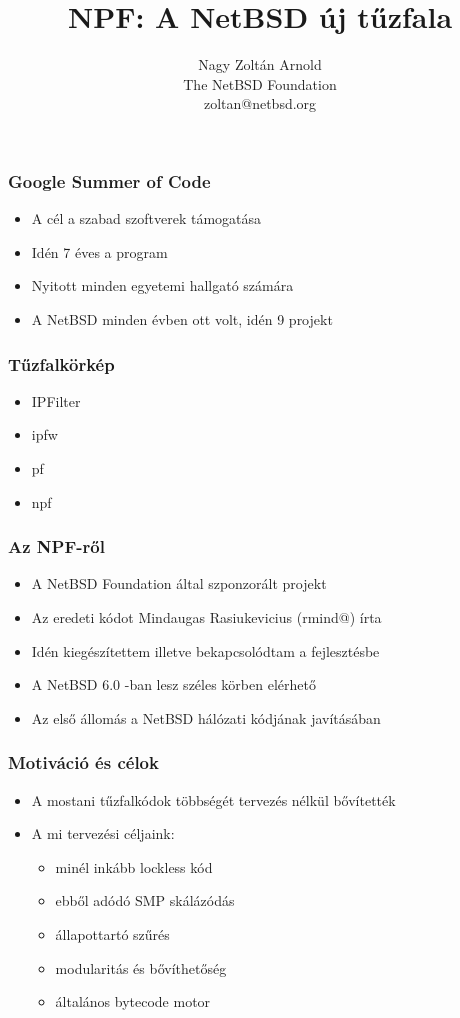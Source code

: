 \documentclass[magyar]{beamer}
\begin{document}
\title{NPF: A NetBSD új tűzfala}
\author{Nagy Zoltán Arnold \\ The NetBSD Foundation \\ zoltan@netbsd.org}
\maketitle

\begin{frame}
\frametitle{Google Summer of Code}
\begin{itemize}
	\item A cél a szabad szoftverek támogatása
	\item Idén 7 éves a program
	\item Nyitott minden egyetemi hallgató számára
	\item A NetBSD minden évben ott volt, idén 9 projekt
\end{itemize}
\end{frame}

\begin{frame}
\frametitle{Tűzfalkörkép}
\begin{itemize}
	\item IPFilter
	\item ipfw
	\item pf
	\item npf
\end{itemize}
\end{frame}

\begin{frame}
\frametitle{Az NPF-ről}
\begin{itemize}
	\item A NetBSD Foundation által szponzorált projekt
	\item Az eredeti kódot Mindaugas Rasiukevicius (rmind@) írta
	\item Idén kiegészítettem illetve bekapcsolódtam a fejlesztésbe
	\item A NetBSD 6.0 -ban lesz széles körben elérhető
	\item Az első állomás a NetBSD hálózati kódjának javításában
\end{itemize}
\end{frame}

\begin{frame}
\frametitle{Motiváció és célok}
\begin{itemize}
	\item A mostani tűzfalkódok többségét tervezés nélkül bővítették
	\item A mi tervezési céljaink:
	\begin{itemize}
		\item minél inkább lockless kód
		\item ebből adódó SMP skálázódás
		\item állapottartó szűrés
		\item modularitás és bővíthetőség
		\item általános bytecode motor
	\end{itemize}
\end{itemize}
\end{frame}
\end{document}
